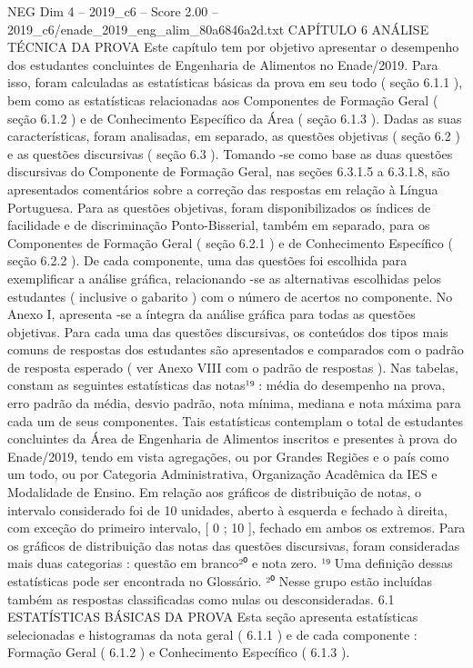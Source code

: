 \begin{textsample}{NEG Dim 4 – 2019\_c6 – Score 2.00 – 2019\_c6/enade\_2019\_eng\_alim\_80a6846a2d.txt}  \label{ex:f4_neg_268}
CAPÍTULO 6 ANÁLISE TÉCNICA DA PROVA Este capítulo tem por objetivo apresentar o desempenho dos estudantes concluintes de Engenharia de Alimentos no Enade/2019.
Para isso, foram calculadas as estatísticas básicas da prova em seu todo ( seção 6.1.1 ), bem como as estatísticas relacionadas aos Componentes de Formação Geral ( seção 6.1.2 ) e de Conhecimento Específico da Área ( seção 6.1.3 ).
Dadas as suas características, foram analisadas, em separado, as questões objetivas ( seção 6.2 ) e as questões discursivas ( seção 6.3 ).
Tomando -se como base as duas questões discursivas do Componente de Formação Geral, nas seções 6.3.1.5 a 6.3.1.8, são apresentados comentários sobre a correção das respostas em relação à Língua Portuguesa.
Para as questões objetivas, foram disponibilizados os índices de facilidade e de discriminação Ponto-Bisserial, também em separado, para os Componentes de Formação Geral ( seção 6.2.1 ) e de Conhecimento Específico ( seção 6.2.2 ).
De cada componente, uma das questões foi escolhida para exemplificar a análise gráfica, relacionando -se as alternativas escolhidas pelos estudantes ( inclusive o gabarito ) com o número de acertos no componente.
No Anexo I, apresenta -se a íntegra da análise gráfica para todas as questões objetivas.
Para cada uma das questões discursivas, os conteúdos dos tipos mais comuns de respostas dos estudantes são apresentados e comparados com o padrão de resposta esperado ( ver Anexo VIII com o padrão de respostas ).
Nas tabelas, constam as seguintes estatísticas das notas¹⁹ : média do desempenho na prova, erro padrão da média, desvio padrão, nota mínima, mediana e nota máxima para cada um de seus componentes.
Tais estatísticas contemplam o total de estudantes concluintes da Área de Engenharia de Alimentos inscritos e presentes à prova do Enade/2019, tendo em vista agregações, ou por Grandes Regiões e o país como um todo, ou por Categoria Administrativa, Organização Acadêmica da IES e Modalidade de Ensino.
Em relação aos gráficos de distribuição de notas, o intervalo considerado foi de 10 unidades, aberto à esquerda e fechado à direita, com exceção do primeiro intervalo, [ 0 ; 10 ], fechado em ambos os extremos.
Para os gráficos de distribuição das notas das questões discursivas, foram consideradas mais duas categorias : questão em branco²⁰ e nota zero. ¹⁹ Uma definição dessas estatísticas pode ser encontrada no Glossário. ²⁰ Nesse grupo estão incluídas também as respostas classificadas como nulas ou desconsideradas. 6.1 ESTATÍSTICAS BÁSICAS DA PROVA Esta seção apresenta estatísticas selecionadas e histogramas da nota geral ( 6.1.1 ) e de cada componente : Formação Geral ( 6.1.2 ) e Conhecimento Específico ( 6.1.3 ).

\end{textsample}
